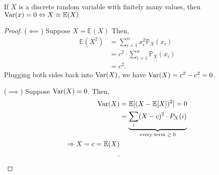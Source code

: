 \begin{prop}
	If \( X \) is a discrete random variable with finitely many values, then \( \operatorname{Var}(x) = 0 \Leftrightarrow X \equiv \mathbb{E}(X) \)
\end{prop}
\begin{proof}
	(\( \impliedby \)) Suppose \( X=\mathbb{E}(X) \) Then,
	\begin{align*}
		\mathbb{E}(X^{2} ) &= \sum_{i=1}^{n} x_{i}^{2}\mathbb{P}_X(x_i)  \\
		&= c^{2}\cdot \sum_{i=1}^{n} \mathbb{P}_X(x_i)  \\
		&= c^{2}
	.\end{align*}
	Plugging both sides back into \( \operatorname{Var}(X) \), we have \( \operatorname{Var}(X) = c^{2} - c^{2} = 0   \).

	(\( \implies \)) Suppose \( \operatorname{Var}(X) = 0 \). Then, 
	\begin{align*}
		\operatorname{Var}(X) &= \mathbb{E}[(X - \mathbb{E}[X] )^{2} ] = 0\\
						&= \underbrace{\sum_{i}(X - c)^{2} \cdot P_X(i)}_{\text{every term \( \ge 0 \)}}  \\
						\Rightarrow X = c = \mathbb{E}(X) \\
	.\end{align*}
\end{proof}
